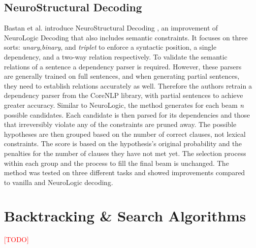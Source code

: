 \subsection{NeuroStructural Decoding}
Bastan et al. introduce NeuroStructural Decoding \cite{bastan_neurostructural_2023}, an improvement of NeuroLogic Decoding that also includes semantic constraints. It focuses on three sorts: \textit{unary},\textit{binary}, and \textit{triplet} to enforce a syntactic position, a single dependency, and a two-way relation respectively. To validate the semantic relations of a sentence a dependency parser is required. However, these parsers are generally trained on full sentences, and when generating partial sentences, they need to establish relations accurately as well. Therefore the authors retrain a dependency parser from the CoreNLP \cite{manning-et-al-2014-corenlp} library, with partial sentences to achieve greater accuracy. Similar to NeuroLogic, the method generates for each beam \textit{n} possible candidates. Each candidate is then parsed for its dependencies and those that irreversibly violate any of the constraints are pruned away. The possible hypotheses are then grouped based on the number of correct clauses, not lexical constraints. The score is based on the hypothesis's original probability and the penalties for the number of clauses they have not met yet. The selection process within each group and the process to fill the final beam is unchanged. The method was tested on three different tasks and showed improvements compared to vanilla and NeuroLogic decoding.
\section{Backtracking \& Search Algorithms}
\textcolor{red}{[TODO]}
